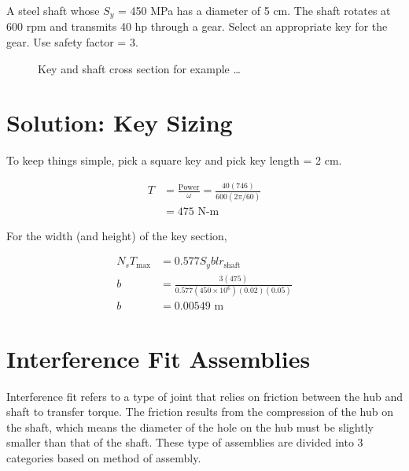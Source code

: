 \documentclass[a4paper,openany]{tufte-book}
\begin{document}
A steel shaft whose \(S_y\) = 450 MPa has a diameter of 5 cm. The shaft rotates at 600 rpm and transmits 40 hp through a gear. Select an appropriate key for the gear. Use safety factor = 3.

\begin{figure}[htbp]
  \centering
\caption{Key and shaft cross section for example \ldots{}}
\end{figure}

\section{Solution: Key Sizing}
\label{sec:orga8c6270}

To keep things simple, pick a square key and pick key length = 2 cm.

\begin{align*}
  T &= \frac{\text{Power}}{\omega} = \frac{40(746)}{600(2\pi/60)} \\
    &= 475 \text{ N-m}
\end{align*}

For the width (and height) of the key section,

\begin{align*}
  N_{s} T_{\max} &= 0.577S_{y}blr_{\text{shaft}} \\
  b &= \frac{3(475)}{0.577(450 \times 10^{6})(0.02)(0.05)} \\
  b &= 0.00549 \text{ m}
\end{align*}

\section{Interference Fit Assemblies}
\label{sec:org8fdff44}

Interference fit refers to a type of joint that relies on friction between the hub and shaft to transfer torque. The friction results from the compression of the hub on the shaft, which means the diameter of the hole on the hub must be slightly smaller than that of the shaft. These type of assemblies are divided into 3 categories based on method of assembly.
\end{document}
